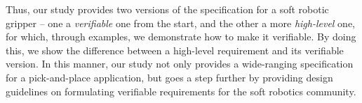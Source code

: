 \documentclass[lettersize,journal]{IEEEtran}
\begin{document}
%

Thus, our study provides two versions of the specification for a soft robotic gripper -- one a \emph{verifiable} one from the start, and the other a more \emph{high-level} one, for which,  through examples, we demonstrate how to make it verifiable. 
By doing this, we show the difference between a high-level requirement and its verifiable version. 
In this manner, our study not only provides a wide-ranging specification for a pick-and-place application, but goes a step further by providing design guidelines on formulating verifiable requirements for the soft robotics community. %




%
%
%
%
%
%
%
\end{document}
